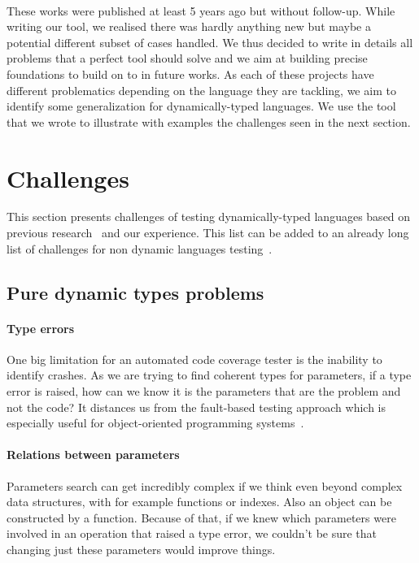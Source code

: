 \documentclass{llncs2e/llncs}
\begin{document}
\paragraph{} These works were published at least 5 years ago but without
follow-up. While writing our tool, we realised there was hardly anything new but
maybe a potential different subset of cases handled. We thus decided to write in
details all problems that a perfect tool should solve and we aim at building
precise foundations to build on to in future works. As each of these projects
have different problematics depending on the language they are tackling, we aim
to identify some generalization for dynamically-typed languages. We use the tool
that we wrote to illustrate with examples the challenges seen in the next
section.


\section{Challenges}
\label{challenges}

This section presents challenges of testing dynamically-typed languages based on
previous research~\cite{ducasse2011challenges} and our experience. This list
can be added to an already long list of challenges for non dynamic languages
testing~\cite{mcminn2011search}.

\subsection{Pure dynamic types problems}
\paragraph{Type errors} One big limitation for an automated code coverage tester
is the inability to identify crashes. As we are trying to find coherent types
for parameters, if a type error is raised, how can we know it is the parameters
that are the problem and not the code? It distances us from the fault-based
testing approach which is especially useful for object-oriented programming
systems~\cite{hayes1994testing}.

\paragraph{Relations between parameters} Parameters search can get incredibly
complex if we think even beyond complex data structures, with for example
functions or indexes. Also an object can be constructed by a function. Because
of that, if we knew which parameters were involved in an operation that raised a
type error, we couldn't be sure that changing just these parameters would
improve things.
\end{document}

